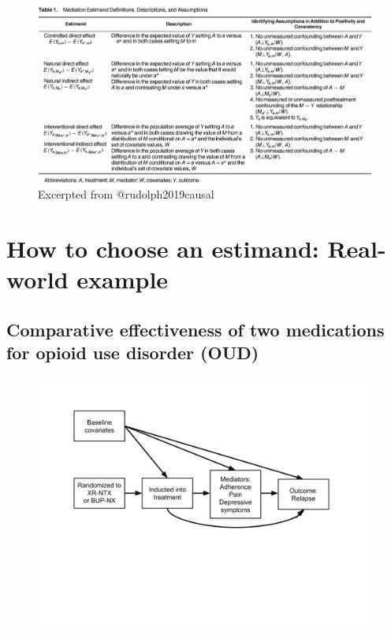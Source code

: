 \documentclass[
  12pt,
]{book}
\theoremstyle{definition}
\theoremstyle{definition}
\theoremstyle{definition}
\newcommand{\1}{\mathbbm{1}}
\begin{document}
\begin{figure}

{\centering \includegraphics[width=1.25\linewidth]{img/table1} 

}

\caption{Excerpted from @rudolph2019causal}\label{fig:unnamed-chunk-22}
\end{figure}

\hypertarget{estimandirl}{%
\chapter{How to choose an estimand: Real-world example}\label{estimandirl}}

\hypertarget{comparative-effectiveness-of-two-medications-for-opioid-use-disorder-oud}{%
\section{Comparative effectiveness of two medications for opioid use disorder (OUD)}\label{comparative-effectiveness-of-two-medications-for-opioid-use-disorder-oud}}

\begin{figure}

{\centering \includegraphics[width=1\linewidth]{img/ctndag} 

}

\end{figure}
\end{document}
